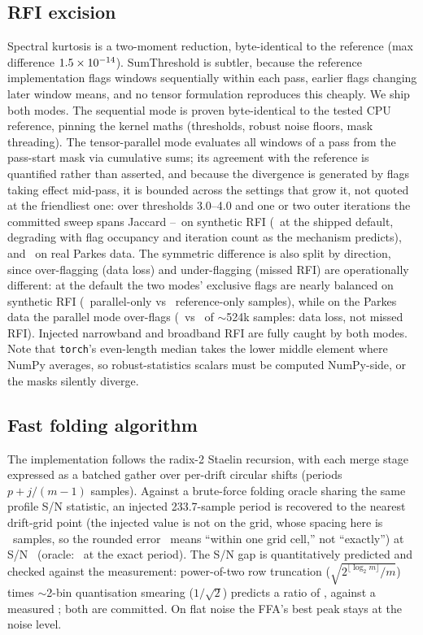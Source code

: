 \documentclass[twocolumn]{aastex631}
\newcommand{\code}[1]{\texttt{#1}}
\begin{document}
\subsection{RFI excision}
Spectral kurtosis \citep{nita2010} is a two-moment reduction, byte-identical to the
reference (max difference $1.5\times10^{-14}$). SumThreshold \citep{offringa2010} is
subtler, because the reference implementation flags windows sequentially within each pass,
earlier flags changing later window means, and no tensor formulation reproduces this
cheaply. We ship both modes. The sequential mode is proven byte-identical to the tested CPU
reference, pinning the kernel maths (thresholds, robust noise floors, mask threading). The
tensor-parallel mode evaluates all windows of a pass from the pass-start mask via cumulative
sums; its agreement with the reference is quantified rather than asserted, and because the
divergence is generated by flags taking effect mid-pass, it is bounded across the settings
that grow it, not quoted at the friendliest one: over thresholds 3.0--4.0 and one or two
outer iterations the committed sweep spans Jaccard \tdRealStJaccardLo--\tdRealStJaccardHi\
on synthetic RFI
(\tdRealStJaccard\ at the shipped default, degrading with flag occupancy and iteration
count as the mechanism predicts), and \tdRealCrabJaccard\ on real Parkes data. The
symmetric difference is also split by direction, since over-flagging (data loss) and
under-flagging (missed RFI) are operationally different: at the default the two modes'
exclusive flags are nearly balanced on synthetic RFI (\tdRealStParOnly\ parallel-only vs
\tdRealStCpuOnly\ reference-only samples), while on the Parkes data the parallel mode
over-flags (\tdRealCrabParOnly\ vs \tdRealCrabCpuOnly\ of $\sim$524k samples: data loss,
not missed RFI). Injected narrowband and broadband RFI are fully caught by both modes. Note that
\code{torch}'s even-length median takes the lower middle element where NumPy averages, so
robust-statistics scalars must be computed NumPy-side, or the masks silently diverge.

\subsection{Fast folding algorithm}
The implementation follows the radix-2 Staelin recursion, with each merge stage expressed
as a batched gather over per-drift circular shifts (periods $p + j/(m{-}1)$ samples).
Against a brute-force folding oracle sharing the same profile S/N statistic, an injected
233.7-sample period is recovered to the nearest drift-grid point (the injected value is
not on the grid, whose spacing here is \tdRealFfaDriftRes\ samples, so the rounded error
\tdRealFfaErr\ means ``within one grid cell,'' not ``exactly'') at S/N \tdRealFfaSnr\
(oracle: \tdRealOracleSnr\ at the exact period). The S/N gap is quantitatively predicted and
checked against the measurement: power-of-two row truncation ($\sqrt{2^{\lfloor\log_2 m\rfloor}/m}$)
times $\sim$2-bin quantisation smearing ($1/\sqrt2$) predicts a ratio of
\tdRealFfaRatioPred, against a measured \tdRealFfaRatioMeas; both are committed. On flat
noise the FFA's best peak stays at the noise level.
\end{document}

